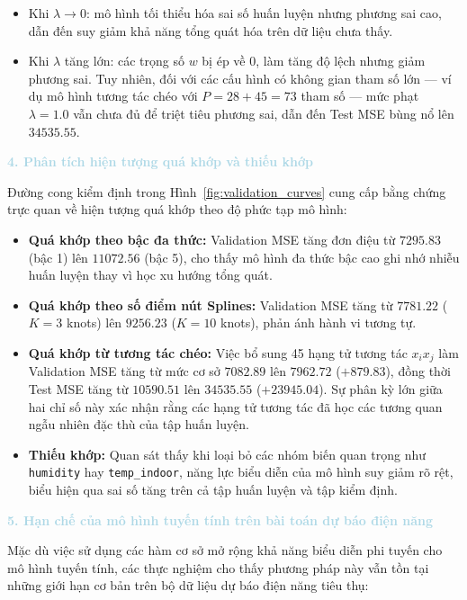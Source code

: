 \begin{itemize}
    \item Khi $\lambda \to 0$: mô hình tối thiểu hóa sai số huấn luyện nhưng phương sai 
    cao, dẫn đến suy giảm khả năng tổng quát hóa trên dữ liệu chưa thấy.
    \item Khi $\lambda$ tăng lớn: các trọng số $w$ bị ép về 0, làm tăng độ lệch nhưng 
    giảm phương sai. Tuy nhiên, đối với các cấu hình có không gian tham số lớn --- ví dụ 
    mô hình tương tác chéo với $P = 28 + 45 = 73$ tham số --- mức phạt $\lambda = 1.0$ 
    vẫn chưa đủ để triệt tiêu phương sai, dẫn đến Test MSE bùng nổ lên $34535.55$.
\end{itemize}

\noindent\textcolor{lightblue}{\textbf{4. Phân tích hiện tượng quá khớp và thiếu khớp}}

Đường cong kiểm định trong Hình~\ref{fig:validation_curves} cung cấp 
bằng chứng trực quan về hiện tượng quá khớp theo độ phức tạp mô hình:

\begin{itemize}
    \item \textbf{Quá khớp theo bậc đa thức:} Validation MSE tăng đơn điệu từ $7295.83$ 
    (bậc 1) lên $11072.56$ (bậc 5), cho thấy mô hình đa thức bậc cao ghi nhớ nhiễu huấn 
    luyện thay vì học xu hướng tổng quát.
    \item \textbf{Quá khớp theo số điểm nút Splines:} Validation MSE tăng từ $7781.22$ 
    ($K=3$ knots) lên $9256.23$ ($K=10$ knots), phản ánh hành vi tương tự.
    \item \textbf{Quá khớp từ tương tác chéo:} Việc bổ sung 45 hạng tử tương tác $x_i x_j$ 
    làm Validation MSE tăng từ mức cơ sở $7082.89$ lên $7962.72$ ($+879.83$), đồng thời 
    Test MSE tăng từ $10590.51$ lên $34535.55$ ($+23945.04$). Sự phân kỳ lớn giữa hai 
    chỉ số này xác nhận rằng các hạng tử tương tác đã học các tương quan ngẫu nhiên đặc 
    thù của tập huấn luyện.
    \item \textbf{Thiếu khớp:} Quan sát thấy khi loại bỏ các nhóm biến quan trọng như 
    \texttt{humidity} hay \texttt{temp\_indoor}, năng lực biểu diễn của mô hình suy giảm 
    rõ rệt, biểu hiện qua sai số tăng trên cả tập huấn luyện và tập kiểm định.
\end{itemize}

\noindent\textcolor{lightblue}{\textbf{5. Hạn chế của mô hình tuyến tính trên bài toán dự báo điện năng}}

Mặc dù việc sử dụng các hàm cơ sở mở rộng khả năng biểu diễn phi tuyến cho mô hình 
tuyến tính, các thực nghiệm cho thấy phương pháp này vẫn tồn tại những giới hạn cơ bản 
trên bộ dữ liệu dự báo điện năng tiêu thụ:

